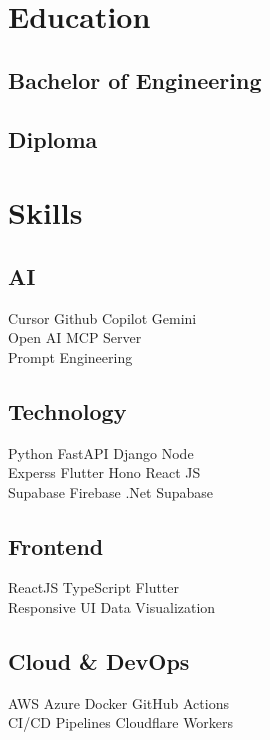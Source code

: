 \documentclass[]{deedy-resume-reversed}
\begin{document}
\begin{minipage}[t]{0.33\textwidth}

\section{Education}

\subsection{Bachelor of Engineering}
\sectionsep

\subsection{Diploma}
\sectionsep

\section{Skills}

\subsection{AI}
Cursor \textbullet Github Copilot \textbullet Gemini\\
Open AI \textbullet MCP Server \\
Prompt Engineering 
\sectionsep

\subsection{Technology}
Python \textbullet FastAPI \textbullet Django \textbullet Node \\
Experss \textbullet Flutter \textbullet Hono \textbullet React JS \\
Supabase \textbullet Firebase \textbullet .Net \textbullet Supabase \\
\sectionsep

\subsection{Frontend}
ReactJS \textbullet TypeScript \textbullet Flutter \\
Responsive UI \textbullet Data Visualization \\
\sectionsep

\subsection{Cloud \& DevOps}
AWS \textbullet Azure \textbullet Docker \textbullet GitHub Actions \\
CI/CD Pipelines \textbullet Cloudflare Workers \\
\sectionsep


\end{minipage}
\end{document}
